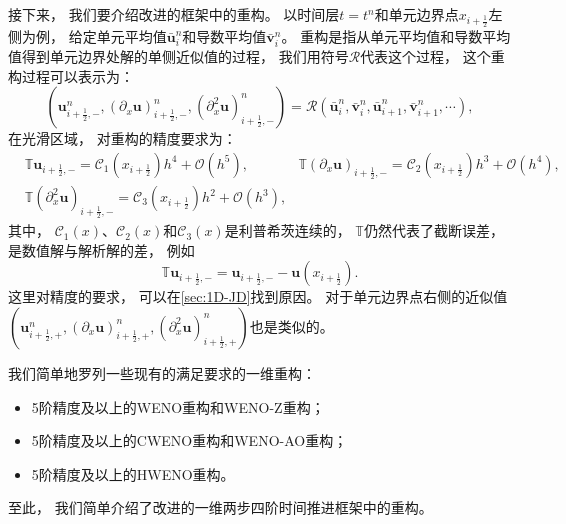接下来，
我们要介绍改进的框架中的重构。
以时间层$t=t^n$和单元边界点$x_{i+\frac{1}{2}}$左侧为例，
给定单元平均值$\bar{\bm{u}}_{i}^n$和导数平均值$\bar{\bm{v}}_{i}^n$。
重构是指从单元平均值和导数平均值得到单元边界处解的单侧近似值的过程，
我们用符号$\mathcal{R}$代表这个过程，
这个重构过程可以表示为：
\begin{equation}
  \label{eq:1D-reconstruction}
  \left({\bm{u}}_{i+\frac{1}{2},-}^n, \left({\partial_{x}}{\bm{u}}\right)_{i+\frac{1}{2},-}^n, \left({\partial_{x}^2}{\bm{u}}\right)_{i+\frac{1}{2},-}^n\right) = \mathcal{R} (\bar{\bm{u}}_{i}^n, \bar{\bm{v}}_{i}^n,\bar{\bm{u}}_{i+1}^n, \bar{\bm{v}}_{i+1}^n, \cdots),
\end{equation}
在光滑区域，
对重构的精度要求为：
\begin{equation}
  \label{eq:1D-rec}
  \begin{aligned}
     & {\mathbb{T}}{\bm u}_{i+\frac12,-} = \mathcal{C}_1(x_{i+\frac{1}{2}})h^4+{\mathcal{O}}(h^{5}), \quad
     & {\mathbb{T}}\left({\partial_x}{\bm u}\right)_{i+\frac12,-} = \mathcal{C}_2(x_{i+\frac{1}{2}})h^3+{\mathcal{O}}(h^{4}),    \\
     & {\mathbb{T}}\left({\partial_x^2}{\bm u}\right)_{i+\frac12,-} = \mathcal{C}_3(x_{i+\frac{1}{2}})h^2+{\mathcal{O}}(h^{3}),
  \end{aligned}
\end{equation}
其中，
$\mathcal{C}_1(x)$、$\mathcal{C}_2(x)$和$\mathcal{C}_3(x)$是利普希茨连续的，
${\mathbb{T}}$仍然代表了截断误差，
是数值解与解析解的差，
例如
\begin{equation}
  {\mathbb{T}}{\bm u}_{i+\frac12,-} = {\bm u}_{i+\frac12,-} - {\bm u}(x_{i+\frac12}).
\end{equation}
这里对精度的要求，
可以在\cref{sec:1D-JD}找到原因。
对于单元边界点右侧的近似值$\left({\bm{u}}_{i+\frac{1}{2},+}^n, \left({\partial_{x}}{\bm{u}}\right)_{i+\frac{1}{2},+}^n, \left({\partial_{x}^2}{\bm{u}}\right)_{i+\frac{1}{2},+}^n\right)$也是类似的。

我们简单地罗列一些现有的满足要求的一维重构：
\begin{itemize}
  \item 5阶精度及以上的WENO重构和WENO-Z重构；
  \item 5阶精度及以上的CWENO重构和WENO-AO重构；
  \item 5阶精度及以上的HWENO重构。
\end{itemize}

至此，
我们简单介绍了改进的一维两步四阶时间推进框架中的重构。

